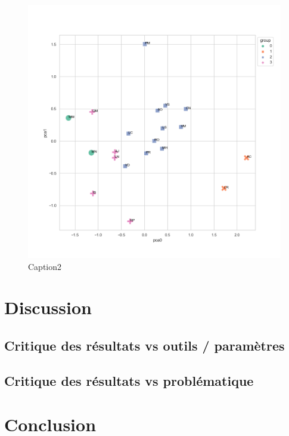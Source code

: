 \documentclass[12pt]{article}
\begin{document}
\begin{figure}
    \includegraphics[width=1\linewidth]{media/clustering_4.png} 
    \caption{Caption2}
    \label{fig:clust}
\end{figure}

\section{Discussion}
\subsection{Critique des résultats vs outils / paramètres}


\subsection{Critique des résultats vs problématique}
\blindtext[3]
\section{Conclusion}
\blindtext[1]

\setcounter{biburlnumpenalty}{7000}
\setcounter{biburllcpenalty}{7000}
\setcounter{biburlucpenalty}{7000}

\printbibliography[heading=bibintoc,title=References]
\end{document}

